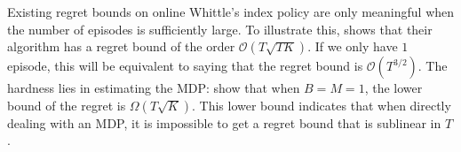 Existing regret bounds on online Whittle's index policy are only meaningful when the number of episodes is sufficiently large. 
To illustrate this, \citet{wang2023optimistic} shows that their algorithm has a regret bound of the order $\mathcal{O}\left(T\sqrt{TK}\right)$. If we only have $1$ episode, this will be equivalent to saying that the regret bound is $\mathcal{O}(T^{3/2})$. The hardness lies in estimating the MDP:  \citealt{azar2017minimax} show that when $B=M=1$, the lower bound of the regret is $\Omega(T\sqrt{K})$. This lower bound indicates that when directly dealing with an MDP, it is impossible to get a regret bound that is sublinear in $T$. 




